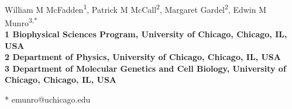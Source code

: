\documentclass[10pt,letterpaper]{article}
\date{}
\begin{document}
\vspace*{0.2in}

\begin{flushleft}
{\Large
\textbf{}
}
\newline
\\
William M McFadden\textsuperscript{1},
Patrick M McCall\textsuperscript{2},
Margaret Gardel\textsuperscript{2},
Edwin M Munro\textsuperscript{3,*}
\\
\bigskip
\bf{1} Biophysical Sciences Program, University of Chicago, Chicago, IL, USA
\\
\bf{2} Department of Physics, University of Chicago, Chicago, IL, USA
\\
\bf{3} Department of Molecular Genetics and Cell Biology, University of Chicago, Chicago, IL, USA
\\
\bigskip

% 
%





* emunro@uchicago.edu

\end{flushleft}
\end{document}
